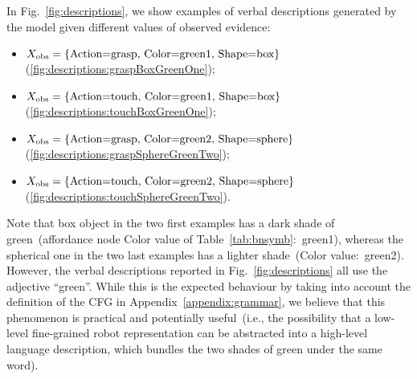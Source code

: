 \newcommand{\evidenceProducingGraspBoxGreenOne}{$\xobs = \{ \text{Action=grasp, Color=green1, Shape=box} \}$}
\newcommand{\evidenceProducingTouchBoxGreenOne}{$\xobs = \{ \text{Action=touch, Color=green1, Shape=box} \}$}
\newcommand{\evidenceProducingGraspSphereGreenTwo}{$\xobs = \{ \text{Action=grasp, Color=green2, Shape=sphere} \}$}
\newcommand{\evidenceProducingTouchSphereGreenTwo}{$\xobs = \{ \text{Action=touch, Color=green2, Shape=sphere} \}$}

In Fig.~\ref{fig:descriptions}, we show examples of verbal descriptions generated by the model given different values of observed evidence:
\begin{itemize}
\item \evidenceProducingGraspBoxGreenOne (\ref{fig:descriptions:graspBoxGreenOne});

\item \evidenceProducingTouchBoxGreenOne (\ref{fig:descriptions:touchBoxGreenOne});

\item \evidenceProducingGraspSphereGreenTwo (\ref{fig:descriptions:graspSphereGreenTwo});

\item \evidenceProducingTouchSphereGreenTwo (\ref{fig:descriptions:touchSphereGreenTwo}).
\end{itemize}
Note that box object in the two first examples has a dark shade of green~(affordance node Color value of Table~\ref{tab:bnsymb}:~green1), whereas the spherical one in the two last examples has a lighter shade~(Color value:~green2).
However, the verbal descriptions reported in Fig.~\ref{fig:descriptions} all use the adjective ``green''.
While this is the expected behaviour by taking into account the definition of the \ac{CFG} in Appendix~\ref{appendix:grammar}, we believe that this phenomenon is practical and potentially useful~(i.e., the possibility that a low-level fine-grained robot representation can be abstracted into a high-level language description, which bundles the two shades of green under the same word).

